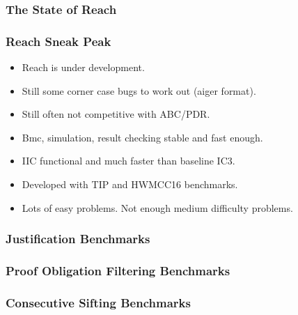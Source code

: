 \documentclass{beamer}
\begin{document}
\subsubsection{The State of Reach}
\begin{frame}
	\frametitle{Reach Sneak Peak}
	\begin{itemize}
		\item Reach is under development.
		\item Still some corner case bugs to work out (aiger format).
		\item Still often not competitive with ABC/PDR.
		\item Bmc, simulation, result checking stable and fast enough.
		\item IIC functional and much faster than baseline IC3.
		\item Developed with TIP and HWMCC16 benchmarks.
		\item Lots of easy problems.  Not enough medium difficulty problems.
	\end{itemize}
\end{frame}

\begin{frame}
	\frametitle{Justification Benchmarks}
	\begin{center}
	\end{center}
\end{frame}

\begin{frame}
	\frametitle{Proof Obligation Filtering Benchmarks}
	\begin{center}
	\end{center}
\end{frame}

\begin{frame}
	\frametitle{Consecutive Sifting Benchmarks}
	\begin{center}
	\end{center}
\end{frame}
\end{document}
